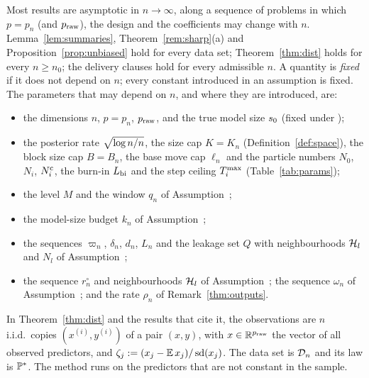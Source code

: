 \begin{definition}\label{def:regime}
Most results are asymptotic in $n\to\infty$, along a sequence of problems in which $p=p_n$ (and $\praw$), the design and
the coefficients may change with $n$. Lemma~\ref{lem:summaries}, Theorem~\ref{rem:sharp}(a) and Proposition~\ref{prop:unbiased} hold for every data
set; Theorem~\ref{thm:dist} holds for every $n\ge n_0$; the delivery clauses hold for every admissible $n$. A quantity is
\emph{fixed} if it does not depend on $n$; every constant introduced
in an assumption is fixed. The parameters that may depend on $n$, and where they are introduced, are:
\begin{itemize}[leftmargin=1.5em,itemsep=0pt]
  \item the dimensions $n$, $p=p_n$, $\praw$, and the true model size $\sz$ (fixed under );
  \item the posterior rate $\rn$, the size cap $K=K_n$ (Definition~\ref{def:space}), the block size cap $B=B_n$, the
    base move cap $\ell_n$ and the particle numbers $N_0$, $N_i$, $\Nc_i$, the burn-in $\Lbi$ and the step ceiling
    $\Tmax_i$ (Table~\ref{tab:params});
  \item the level $M$ and the window $q_n$ of Assumption~;
  \item the model-size budget $k_n$ of Assumption~;
  \item the sequences $\varpi_n$, $\delta_n$, $d_n$, $L_n$ and the leakage set $Q$ with neighbourhoods $\Hl_l$ and
    $N_l$ of Assumption~;
  \item the sequence $r^\circ_n$ and neighbourhoods $\Hl_l$ of Assumption~; the sequence $\omega_n$ of
    Assumption~; and the rate $\rho_n$ of Remark~\ref{thm:outputs}.
\end{itemize}
\end{definition}

\begin{definition}\label{def:dist-setting}
In Theorem~\ref{thm:dist} and the results that cite it, the observations are $n$ i.i.d.\ copies $(x^{(i)},y^{(i)})$ of a
pair $(x,y)$, with $x\in\R^{\praw}$ the vector of all observed predictors, and $\zeta_j:=(x_j-\E x_j)/\sd(x_j)$. The data
set is $\Dn$ and its law is $\P^*$. The method runs on the predictors that are not constant in the sample.
\end{definition}
